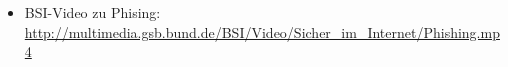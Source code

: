 \begin{frame}
\begin{itemize}
  
  
  \item BSI-Video zu Phising: \href{http://multimedia.gsb.bund.de/BSI/Video/Sicher\_im\_Internet/Phishing.mp4}{\url{http://multimedia.gsb.bund.de/BSI/Video/Sicher\_im\_Internet/Phishing.mp4}}
\end{itemize}
\end{frame}